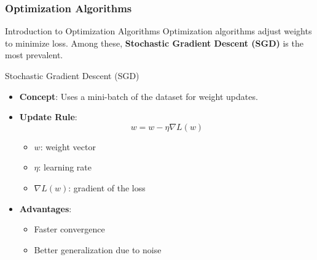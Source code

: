 \documentclass[aspectratio=169]{beamer}
\begin{document}
\begin{frame}[fragile]
    \frametitle{Optimization Algorithms}
    \begin{block}{Introduction to Optimization Algorithms}
        Optimization algorithms adjust weights to minimize loss. Among these, \textbf{Stochastic Gradient Descent (SGD)} is the most prevalent.
    \end{block}
    
    \begin{block}{Stochastic Gradient Descent (SGD)}
        \begin{itemize}
            \item \textbf{Concept}: Uses a mini-batch of the dataset for weight updates.
            \item \textbf{Update Rule}:
            \begin{equation}
                w = w - \eta \nabla L(w)
            \end{equation}
            \begin{itemize}
                \item \(w\): weight vector
                \item \(\eta\): learning rate
                \item \(\nabla L(w)\): gradient of the loss
            \end{itemize}
            \item \textbf{Advantages}:
              \begin{itemize}
                \item Faster convergence
                \item Better generalization due to noise
              \end{itemize}
        \end{itemize}
    \end{block}
\end{frame}
\end{document}
